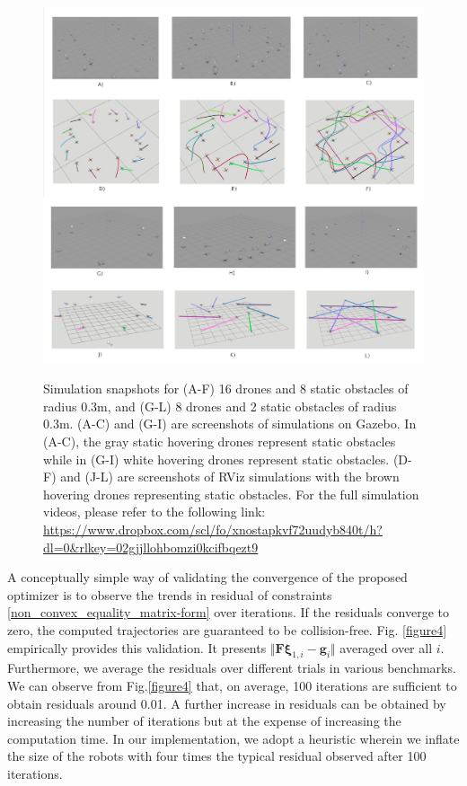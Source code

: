 \begin{figure}
    \centering
    {\includegraphics{figures/gpu_mat/gazebo_sim_snaps.jpg}} 
    \caption[Gazebo Simulation Snapshots]{Simulation snapshots for (A-F) 16 drones and 8 static obstacles of radius 0.3m, and (G-L) 8 drones and 2 static obstacles of radius 0.3m. (A-C) and (G-I) are screenshots of simulations on Gazebo. In (A-C), the gray static hovering drones represent static obstacles while in (G-I) white hovering drones represent static obstacles. (D-F) and (J-L) are screenshots of RViz simulations with the brown hovering drones representing static obstacles. For the full simulation videos, please refer to the following link: \url{https://www.dropbox.com/scl/fo/xnostapkvf72uudyb840t/h?dl=0&rlkey=02gjjllohbomzi0kcifbqezt9} }
    \label{figure_gazebo}
\end{figure}


A conceptually simple way of validating the convergence of the proposed optimizer is to observe the trends in residual of constraints \eqref{non_convex_equality_matrix-form} over iterations. If the residuals converge to zero, the computed trajectories are guaranteed to be collision-free. Fig. \ref{figure4} empirically provides this validation. It presents $\Vert \textbf{F}\boldsymbol{\xi}_{1, i}-\textbf{g}_i\Vert$ averaged over all $i$. Furthermore, we average the residuals over different trials in various benchmarks. We can observe from Fig.\ref{figure4} that, on average, 100 iterations are sufficient to obtain residuals around 0.01. A further increase in residuals can be obtained by increasing the number of iterations but at the expense of increasing the computation time. In our implementation, we adopt a heuristic wherein we inflate the size of the robots with four times the typical residual observed after 100 iterations.



